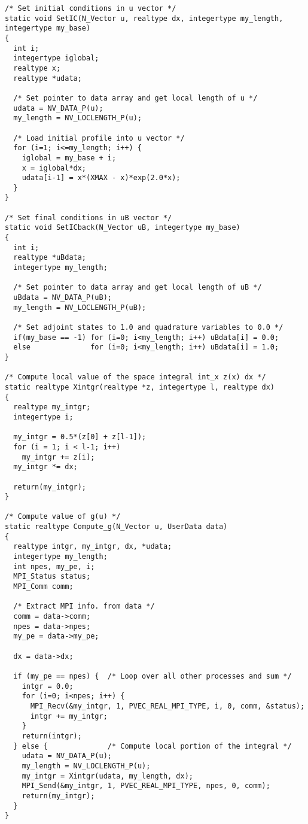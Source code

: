 \begin{verbatim}
/* Set initial conditions in u vector */
static void SetIC(N_Vector u, realtype dx, integertype my_length, integertype my_base)
{
  int i;
  integertype iglobal;
  realtype x;
  realtype *udata;

  /* Set pointer to data array and get local length of u */
  udata = NV_DATA_P(u);
  my_length = NV_LOCLENGTH_P(u);

  /* Load initial profile into u vector */
  for (i=1; i<=my_length; i++) {
    iglobal = my_base + i;
    x = iglobal*dx;
    udata[i-1] = x*(XMAX - x)*exp(2.0*x);
  }  
}

/* Set final conditions in uB vector */
static void SetICback(N_Vector uB, integertype my_base)
{
  int i;
  realtype *uBdata;
  integertype my_length;

  /* Set pointer to data array and get local length of uB */
  uBdata = NV_DATA_P(uB);
  my_length = NV_LOCLENGTH_P(uB);

  /* Set adjoint states to 1.0 and quadrature variables to 0.0 */
  if(my_base == -1) for (i=0; i<my_length; i++) uBdata[i] = 0.0;
  else              for (i=0; i<my_length; i++) uBdata[i] = 1.0;
}

/* Compute local value of the space integral int_x z(x) dx */
static realtype Xintgr(realtype *z, integertype l, realtype dx)
{
  realtype my_intgr;
  integertype i;

  my_intgr = 0.5*(z[0] + z[l-1]);
  for (i = 1; i < l-1; i++)
    my_intgr += z[i]; 
  my_intgr *= dx;

  return(my_intgr);
}

/* Compute value of g(u) */
static realtype Compute_g(N_Vector u, UserData data)
{
  realtype intgr, my_intgr, dx, *udata;
  integertype my_length;
  int npes, my_pe, i;
  MPI_Status status;
  MPI_Comm comm;

  /* Extract MPI info. from data */
  comm = data->comm;
  npes = data->npes;
  my_pe = data->my_pe;

  dx = data->dx;

  if (my_pe == npes) {  /* Loop over all other processes and sum */
    intgr = 0.0;
    for (i=0; i<npes; i++) {
      MPI_Recv(&my_intgr, 1, PVEC_REAL_MPI_TYPE, i, 0, comm, &status); 
      intgr += my_intgr;
    }
    return(intgr);
  } else {              /* Compute local portion of the integral */
    udata = NV_DATA_P(u);
    my_length = NV_LOCLENGTH_P(u);
    my_intgr = Xintgr(udata, my_length, dx);
    MPI_Send(&my_intgr, 1, PVEC_REAL_MPI_TYPE, npes, 0, comm);
    return(my_intgr);
  }
}


\end{verbatim}
